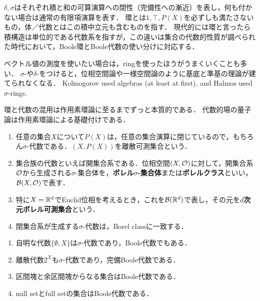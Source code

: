 \documentclass[uplatex, dvipdfmx]{jsreport}
\renewcommand{\B}{\mathcal{B}}
\begin{document}
\begin{remark}
    $\delta,\sigma$はそれぞれ積と和の可算演算への閉性（完備性への漸近）を表し，何も付かない場合は通常の有限項演算を表す．
    環とは$1,\top,P(X)$を必ずしも満たさないもの，体／代数とはこの積中立元も含むものを指す．
    現代的には環と言ったら積構造は単位的である代数系を指すが，この違いは集合の代数的性質が調べられた時代において，Boole環とBoole代数の使い分けに対応する．

    ベクトル値の測度を使いたい場合は，ringを使ったほうがうまくいくことも多い．
    $\sigma$-や$\delta$-をつけると，位相空間論や一様空間論のように基底と準基の理論が建てられなくなる．
    Kolmogorov used algebras (at least at first), and Halmos used $\sigma$-rings.

    環と代数の混用は作用素環論に至るまでずっと本質的である．
    代数的場の量子論は作用素環論による基礎付けである．
\end{remark}

\begin{example}\mbox{}
    \begin{enumerate}
        \item 任意の集合$X$について$P(X)$は，任意の集合演算に閉じているので，もちろん$\sigma$-代数である．$(X,P(X))$を離散可測集合という．
        \item 集合族の代数といえば開集合系である．位相空間$(X,\mathcal{O})$に対して，開集合系$\mathcal{O}$から生成される$\sigma$-集合体を，\textbf{ボレル$\sigma$-集合体}または\textbf{ボレルクラス}といい，$\B(X,\O)$で表す．
        \item 特に$X=\mathbb{R}^d$でEuclid位相を考えるとき，これを$\B(\R^d)$で表し，その元を\textbf{$d$次元ボレル可測集合}という．
        \item 閉集合系が生成する$\sigma$-代数は，Borel classに一致する．
    \end{enumerate}
\end{example}

\begin{example}\mbox{}
    \begin{enumerate}
        \item 自明な代数$\{\emptyset,X\}$は$\sigma$-代数であり，Boole代数でもある．
        \item 離散代数$2^X$も$\sigma$-代数であり，完備Boole代数である．
        \item 区間塊と余区間塊からなる集合はBoole代数である．
        \item null setとfull setの集合はBoole代数である．
    \end{enumerate}
\end{example}
\end{document}
